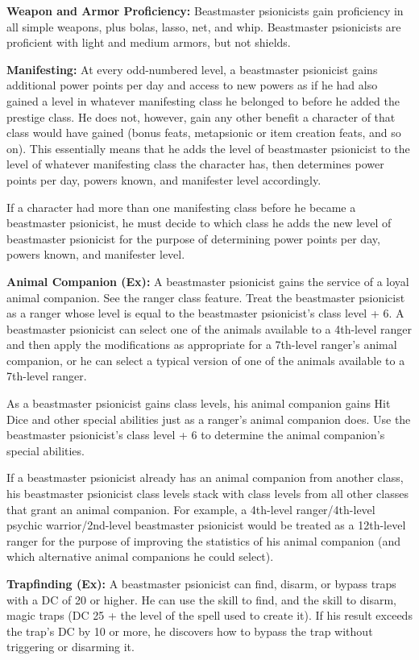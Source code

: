 {
\textbf{Weapon and Armor Proficiency:} Beastmaster psionicists gain proficiency in all simple weapons, plus bolas, lasso, net, and whip. Beastmaster psionicists are proficient with light and medium armors, but not shields.

\textbf{Manifesting:} At every odd-numbered level, a beastmaster psionicist gains additional power points per day and access to new powers as if he had also gained a level in whatever manifesting class he belonged to before he added the prestige class. He does not, however, gain any other benefit a character of that class would have gained (bonus feats, metapsionic or item creation feats, and so on). This essentially means that he adds the level of beastmaster psionicist to the level of whatever manifesting class the character has, then determines power points per day, powers known, and manifester level accordingly.

If a character had more than one manifesting class before he became a beastmaster psionicist, he must decide to which class he adds the new level of beastmaster psionicist for the purpose of determining power points per day, powers known, and manifester level.

\textbf{Animal Companion (Ex):} A beastmaster psionicist gains the service of a loyal animal companion. See the ranger class feature. Treat the beastmaster psionicist as a ranger whose level is equal to the beastmaster psionicist's class level + 6. A beastmaster psionicist can select one of the animals available to a 4th-level ranger and then apply the modifications as appropriate for a 7th-level ranger's animal companion, or he can select a typical version of one of the animals available to a 7th-level ranger.

As a beastmaster psionicist gains class levels, his animal companion gains Hit Dice and other special abilities just as a ranger's animal companion does. Use the beastmaster psionicist's class level + 6 to determine the animal companion's special abilities.

If a beastmaster psionicist already has an animal companion from another class, his beastmaster psionicist class levels stack with class levels from all other classes that grant an animal companion. For example, a 4th-level ranger/4th-level psychic warrior/2nd-level beastmaster psionicist would be treated as a 12th-level ranger for the purpose of improving the statistics of his animal companion (and which alternative animal companions he could select).

\textbf{Trapfinding (Ex):} A beastmaster psionicist can find, disarm, or bypass traps with a DC of 20 or higher. He can use the  skill to find, and the  skill to disarm, magic traps (DC 25 + the level of the spell used to create it). If his  result exceeds the trap's DC by 10 or more, he discovers how to bypass the trap without triggering or disarming it.

}
